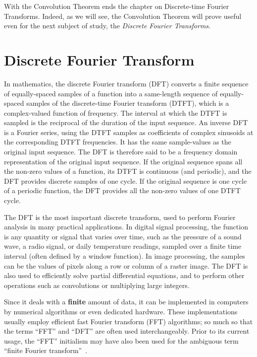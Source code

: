 \documentclass[\documentfontsize, twocolumn]{\classname}
\begin{document}
With the Convolution Theorem ends the chapter on Discrete-time Fourier Transforms. Indeed, as we will see, the Convolution Theorem will prove useful even for the next subject of study, the \emph{Discrete Fourier Transforms}.


\chapter{Discrete Fourier Transform}

In mathematics, the discrete Fourier transform (DFT) converts a finite sequence of equally-spaced samples of a function into a same-length sequence of equally-spaced samples of the discrete-time Fourier transform (DTFT), which is a complex-valued function of frequency. The interval at which the DTFT is sampled is the reciprocal of the duration of the input sequence. An inverse DFT is a Fourier series, using the DTFT samples as coefficients of complex sinusoids at the corresponding DTFT frequencies. It has the same sample-values as the original input sequence. The DFT is therefore said to be a frequency domain representation of the original input sequence. If the original sequence spans all the non-zero values of a function, its DTFT is continuous (and periodic), and the DFT provides discrete samples of one cycle. If the original sequence is one cycle of a periodic function, the DFT provides all the non-zero values of one DTFT cycle.

The DFT is the most important discrete transform, used to perform Fourier analysis in many practical applications. In digital signal processing, the function is any quantity or signal that varies over time, such as the pressure of a sound wave, a radio signal, or daily temperature readings, sampled over a finite time interval (often defined by a window function). In image processing, the samples can be the values of pixels along a row or column of a raster image. The DFT is also used to efficiently solve partial differential equations, and to perform other operations such as convolutions or multiplying large integers.

Since it deals with a \textbf{finite} amount of data, it can be implemented in computers by numerical algorithms or even dedicated hardware. These implementations usually employ efficient fast Fourier transform (FFT) algorithms; so much so that the terms ``FFT'' and ``DFT'' are often used interchangeably. Prior to its current usage, the ``FFT'' initialism may have also been used for the ambiguous term ``finite Fourier transform''~\cite{bib:discreteFourierTransform}.
\end{document}
